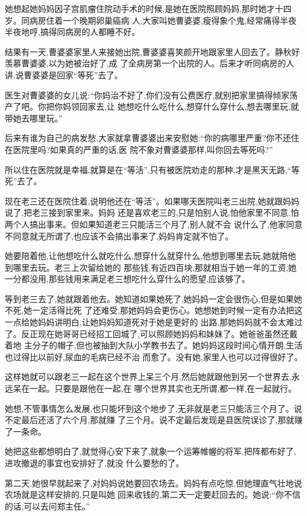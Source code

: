 ﻿\documentclass[12pt]{article}
\begin{document}
她想起她妈妈因子宫肌瘤住院动手术的时候,是她在医院照顾妈妈,那时她才十四岁。同病房住着一个晚期卵巢癌病
人,大家叫她曹婆婆,瘦得象个鬼,经常痛得半夜半夜地哼,搞得同病房的人都睡不好。

结果有一天,曹婆婆家里人来接她出院,曹婆婆喜笑颜开地跟家里人回去了。静秋好羡慕曹婆婆,以为她被治好了,成
了全病房第一个出院的人。后来才听同病房的人讲,说曹婆婆是回家``等死''去了。

医生对曹婆婆的女儿说:``你妈治不好了,你们没有公费医疗,就别把家里搞得倾家荡产了吧。你把你妈领回家去,让
她想吃什么吃什么,想穿什么穿什么,想去哪里玩,就带她去哪里玩。''

后来有谁为自己的病发愁,大家就拿曹婆婆出来安慰她:``你的病哪里严重?你不还住在医院里吗?如果真的严重的话,医
院不象对曹婆婆那样,叫你回去等死吗?''

所以住在医院就是幸福,就算是在``等活'',只有被医院劝走的那种,才是黑天无路,``等死''去了。

现在老三还在医院住着,说明他还在``等活''。如果哪天医院叫老三出院,她就跟妈妈说了,把老三接到家里来。妈妈
还是喜欢老三的,只是怕别人说,怕他家里不同意,怕两个人搞出事来。但如果知道老三只能活三个月了,别人就不会
说什么了,他家同意不同意就无所谓了,也应该不会搞出事来了,妈妈肯定就不怕了。

她要陪着他,让他想吃什么就吃什么,想穿什么就穿什么,他想到哪里去玩,她就陪他到哪里去玩。老三上次留给她的
那些钱,有近四百块,那就相当于她一年的工资,她一分都没用,那些钱用来满足老三想吃什么穿什么的愿望,应该够了。

等到老三\myrule 去了,她就跟着他去。她知道如果她死了,她妈妈一定会很伤心,但是如果她不死,她一定活得比死
了还难受,那她妈妈会更伤心。她想她到时候一定有办法把这一点给她妈妈讲明白,让她妈妈知道死对于她是更好的
出路,那她妈妈就不会太难过了。反正现在她哥哥已经招工回城了,可以照顾她妈妈和妹妹了。她爸爸虽然还戴着地
主分子的帽子,但也被抽到大队小学教书去了。她妈妈这段时间心情开朗,生活也过得比以前好,尿血的毛病已经不治
而愈了。没有她,家里人也可以过得很好了。

这样她就可以跟老三一起在这个世界上呆三个月,然后她就跟他到另一个世界去,永远呆在一起。只要是跟他在一起,在
哪个世界其实也无所谓,都一样,在一起就行。

她想,不管事情怎么发展,也只能坏到这个地步了,无非就是老三只能活三个月了。说不定最后还活了六个月,那就赚
了三个月。说不定最后发现是县医院误诊了,那就赚了一条命。


她把这些都想明白了,就觉得心安下来了,就象一个运筹帷幄的将军,把阵都布好了,进攻撤退的事宜也安排好了,就没
什么要愁的了。

第二天,她很早就起来了,对妈妈说她要回农场去。妈妈有点吃惊,但她理直气壮地说农场就是这样安排的,只是叫她
回来收钱的,第二天一定要赶回去的。她说:``你不信的话,可以去问郑主任。''
\end{document}
